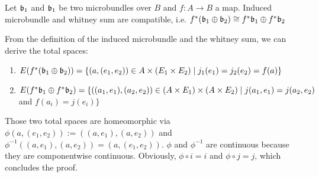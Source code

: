 \begin{mylemma}
    Let $\mathfrak{b}_1$ and $\mathfrak{b}_1$ be two microbundles over $B$ and $f: A \to B$ a map.
    Induced microbundle and whitney sum are compatible, i.e. $f^*(\mathfrak{b}_1 \oplus \mathfrak{b}_2) \cong f^*\mathfrak{b}_1 \oplus f^*\mathfrak{b}_2$
\end{mylemma}
\begin{myproof}
From the definition of the induced microbundle and the whitney sum, we can derive the total spaces:
\begin{enumerate}
    \item $E(f^*(\mathfrak{b}_1 \oplus \mathfrak{b}_2)) = \{(a, (e_1, e_2)) \in A \times (E_1 \times E_2) \mid j_1(e_1) = j_2(e_2) = f(a) \}$
    \item $E(f^*\mathfrak{b}_1 \oplus f^*\mathfrak{b}_2) = \{((a_1, e_1), (a_2, e_2)) \in (A \times E_1) \times (A \times E_2) \mid j(a_1, e_1) = j(a_2, e_2)$ and $f(a_i) = j(e_i)\}$
\end{enumerate}
Those two total spaces are homeomorphic via $\phi(a, (e_1, e_2)) := ((a, e_1), (a, e_2))$ and
$\phi^{-1}((a, e_1), (a, e_2)) = (a, (e_1, e_2))$. $\phi$ and $\phi^{-1}$ are continuous because they are componentwise continuous.
Obviously, $\phi \circ i = i$ and $\phi \circ j = j$, which concludes the proof. 
\end{myproof}